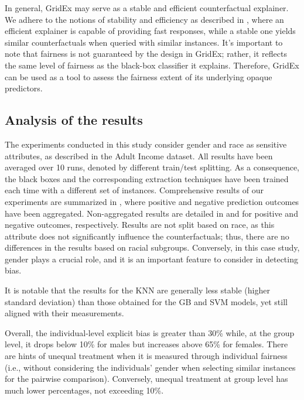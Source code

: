 \documentclass[letterpaper]{article} %
\begin{document}
In general, GridEx may serve as a stable and efficient counterfactual explainer. We adhere to the notions of stability and efficiency as described in \cite{guidotti2022counterfactual}, where an efficient explainer is capable of providing fast responses, while a stable one yields similar counterfactuals when queried with similar instances.
%
It's important to note that fairness is not guaranteed by the design in GridEx; rather, it reflects the same level of fairness as the black-box classifier it explains. Therefore, GridEx can be used as a tool to assess the fairness extent of its underlying opaque predictors.

\subsection{Analysis of the results}


The experiments conducted in this study consider gender and race as sensitive attributes, as described in the Adult Income dataset.
%
All results have been averaged over 10 runs, denoted by different train/test splitting.
%
As a consequence, the black boxes and the corresponding extraction techniques have been trained each time with a different set of instances.
%
Comprehensive results of our experiments are summarized in , where positive and negative prediction outcomes have been aggregated. Non-aggregated results are detailed in  and  for positive and negative outcomes, respectively.
%
Results are not split based on race, as this attribute does not significantly influence the counterfactuals; thus, there are no differences in the results based on racial subgroups.
%
Conversely, in this case study, gender plays a crucial role, and it is an important feature to consider in detecting bias.

It is notable that the results for the KNN are generally less stable (higher standard deviation) than those obtained for the GB and SVM models, yet still aligned with their measurements.

Overall, the individual-level explicit bias is greater than 30\% while, at the group level, it drops below 10\% for males but increases above 65\% for females.
%
There are hints of unequal treatment when it is measured through individual fairness (i.e., without considering the individuals' gender when selecting similar instances for the pairwise comparison). Conversely, unequal treatment at group level has much lower percentages, not exceeding 10\%.
\end{document}
